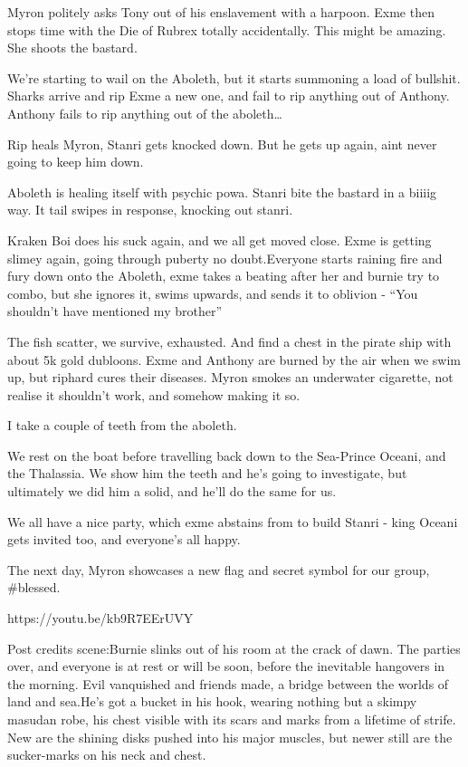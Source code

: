 Myron politely asks Tony out of his enslavement with a harpoon. Exme then stops time with the Die of Rubrex totally accidentally. This might be amazing. She shoots the bastard.\medskip

We’re starting to wail on the Aboleth, but it starts summoning a load of bullshit. Sharks arrive and rip Exme a new one, and fail to rip anything out of Anthony. Anthony fails to rip anything out of the aboleth…\medskip

Rip heals Myron, Stanri gets knocked down. But he gets up again, aint never going to keep him down.\medskip

Aboleth is healing itself with psychic powa. Stanri bite the bastard in a biiiig way. It tail swipes in response, knocking out stanri.\medskip

Kraken Boi does his suck again, and we all get moved close. Exme is getting slimey again, going through puberty no doubt.Everyone starts raining fire and fury down onto the Aboleth, exme takes a beating after her and burnie try to combo, but she ignores it, swims upwards, and sends it to oblivion - “You shouldn’t have mentioned my brother”\medskip

The fish scatter, we survive, exhausted. And find a chest in the pirate ship with about 5k gold dubloons. Exme and Anthony are burned by the air when we swim up, but riphard cures their diseases. Myron smokes an underwater cigarette, not realise it shouldn't work, and somehow making it so.\medskip

I take a couple of teeth from the aboleth.\medskip

We rest on the boat before travelling back down to the Sea-Prince Oceani, and the Thalassia. We show him the teeth and he’s going to investigate, but ultimately we did him a solid, and he’ll do the same for us.\medskip

We all have a nice party, which exme abstains from to build Stanri - king Oceani gets invited too, and everyone's all happy.\medskip

The next day, Myron showcases a new flag and secret symbol for our group, \#blessed.\medskip

https://youtu.be/kb9R7EErUVY

Post credits scene:Burnie slinks out of his room at the crack of dawn. The parties over, and everyone is at rest or will be soon, before the inevitable hangovers in the morning. Evil vanquished and friends made, a bridge between the worlds of land and sea.He’s got a bucket in his hook, wearing nothing but a skimpy masudan robe, his chest visible with its scars and marks from a lifetime of strife. New are the shining disks pushed into his major muscles, but newer still are the sucker-marks on his neck and chest.\medskip

